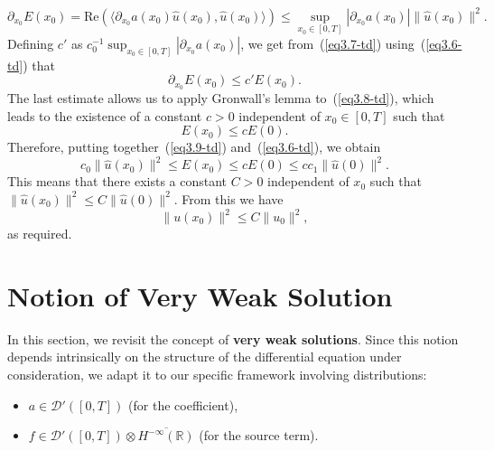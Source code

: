 \documentclass[12pt]{amsart}
\theoremstyle{definition}
\begin{document}
\begin{equation}
\partial_{x_0}E(x_0)=\mathrm{Re}\left(\langle \partial_{x_0}a(x_0)\hat{u}(x_0), \hat{u}(x_0) \rangle \right)\leq \sup_{x_0 \in [0,T]} |\partial_{x_0}a(x_0)| \|\hat{u}(x_0)\|^2.
\label{eq3.7-td}
\end{equation}
Defining $c'$ as $c_0^{-1} \sup_{x_0 \in [0,T]} |\partial_{x_0}a(x_0)|$, we get from~(\ref{eq3.7-td}) using~(\ref{eq3.6-td}) that
\begin{equation}
\partial_{x_0}E(x_0)  \leq c'E(x_0).
\label{eq3.8-td}
\end{equation}
The last estimate allows us to apply Gronwall's lemma to~(\ref{eq3.8-td}), which leads to the existence of a constant $c > 0$ independent of $x_0 \in [0, T]$ such that
\begin{equation}
E(x_0) \leq cE(0).\label{eq3.9-td}
\end{equation}
Therefore, putting together~(\ref{eq3.9-td}) and~(\ref{eq3.6-td}), we obtain
\begin{equation*}
c_0\|\hat{u}(x_0)\|^2 \leq E(x_0) \leq cE(0) \leq cc_1\|\hat{u}(0)\|^2.
\end{equation*}
This means that there exists a constant $C > 0$ independent of $x_0$ such that $\|\hat{u}(x_0)\|^2 \leq C\|\hat{u}(0)\|^2$. From this we have
\begin{equation*}
\|u(x_0)\|^2  \leq C\|u_0\|^2,
\end{equation*}
as required.

\section{Notion of Very Weak Solution}

In this section, we revisit the concept of \textbf{very weak solutions}. Since this notion depends intrinsically on the structure of the differential equation under consideration, we adapt it to our specific framework involving distributions:
\begin{itemize}
    \item $a \in \mathcal{D}'([0, T])$ (for the coefficient),
    \item $f \in \mathcal{D}'([0, T]) \otimes \overline{H^{-\infty}(\mathbb{R})}$ (for the source term).
\end{itemize}
\end{document}
